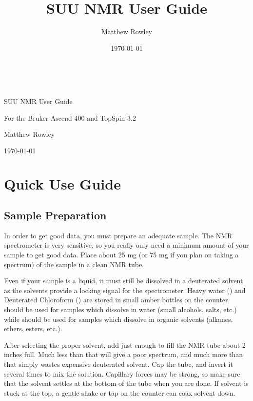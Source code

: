 \documentclass[12pt, openany, letterpaper]{memoir}
\begin{document}
\title{SUU NMR User Guide}
\author{Matthew Rowley}
\date{\today}

\begin{center}
\pagestyle{empty}
~

\vspace{8em}
{\LARGE SUU NMR User Guide}

\vspace{1em}
{\large For the Bruker Ascend 400 and TopSpin 3.2}

\vspace{10em}
{\large Matthew Rowley}

\vspace{2em}
\today
\end{center}
\frontmatter
\tableofcontents*

\mainmatter
{}
\chapter{Quick Use Guide}
\label{CH:Quick}

\section{Sample Preparation}
In order to get good data, you must prepare an adequate sample. The NMR spectrometer is very sensitive, so you really only need a minimum amount of your sample to get good data. Place about 25 mg (or 75 mg if you plan on taking a  spectrum) of the sample in a clean NMR tube.

Even if your sample is a liquid, it must still be dissolved in a deuterated solvent as the solvents provide a locking signal for the spectrometer. Heavy water () and Deuterated Chloroform () are stored in small amber bottles on the counter.  should be used for samples which dissolve in water (small alcohols, salts, etc.) while  should be used for samples which dissolve in organic solvents (alkanes, ethers, esters, etc.).

After selecting the proper solvent, add just enough to fill the NMR tube about 2 inches full. Much less than that will give a poor spectrum, and much more than that simply wastes expensive deuterated solvent. Cap the tube, and invert it several times to mix the solution. Capillary forces may be strong, so make sure that the solvent settles at the bottom of the tube when you are done. If solvent is stuck at the top, a gentle shake or tap on the counter can coax solvent down. 
\end{document}
